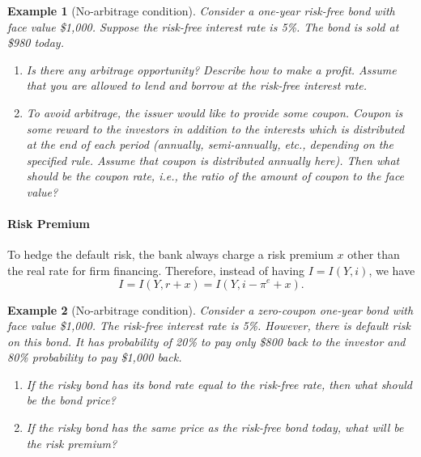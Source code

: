 \documentclass[12pt]{article}
\newtheorem{example}{Example}
\begin{document}
\begin{example}[No-arbitrage condition]
    Consider a one-year risk-free bond with face value \$1,000. Suppose the risk-free interest rate is 5\%. The bond is sold at \$980 today.
    \begin{enumerate}[label=(\arabic*)]
        \item Is there any arbitrage opportunity? Describe how to make a profit. Assume that you are allowed to lend and borrow at the risk-free interest rate.
        \item To avoid arbitrage, the issuer would like to provide some coupon. Coupon is some reward to the investors in addition to the interests which is distributed at the end of each period (annually, semi-annually, etc., depending on the specified rule. Assume that coupon is distributed annually here). Then what should be the coupon rate, i.e., the ratio of the amount of coupon to the face value?
    \end{enumerate}
\end{example}


\paragraph{Risk Premium}
To hedge the default risk, the bank always charge a risk premium $x$ other than the real rate for firm financing. Therefore, instead of having $I = I(Y,i)$, we have
\[ I = I (Y, r+x) = I(Y, i-\pi^e+x).\]

\begin{example}[No-arbitrage condition]
    Consider a zero-coupon one-year bond with face value \$1,000. The risk-free interest rate is 5\%. However, there is default risk on this bond. It has probability of 20\% to pay only \$800 back to the investor and 80\% probability to pay \$1,000 back. 
    \begin{enumerate}[label=(\arabic*)]
        \item If the risky bond has its bond rate equal to the risk-free rate, then what should be the bond price?
        \item If the risky bond has the same price as the risk-free bond today, what will be the risk premium?
    \end{enumerate}
\end{example}
\end{document}

